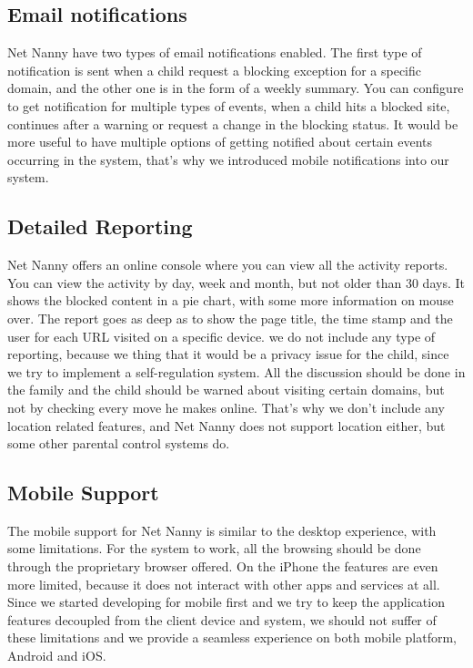 \subsection{Email notifications}

Net Nanny have two types of email notifications enabled. The first type of notification is sent when a child request a blocking exception for a specific domain, and the other one is in the form of a weekly summary. You can configure to get notification for multiple types of events, when a child hits a blocked site, continues after a warning or request a change in the blocking status. It would be more useful to have multiple options of getting notified about certain events occurring in the system, that's why we introduced mobile notifications into our system.

\subsection{Detailed Reporting}

Net Nanny offers an online console where you can view all the activity reports. You can view the activity by day, week and month, but not older than 30 days. It shows the blocked content in a pie chart, with some more information on mouse over. The report goes as deep as to show the page title, the time stamp and the user for each URL visited on a specific device. we do not include any type of reporting, because we thing that it would be a privacy issue for the child, since we try to implement a self-regulation system. All the discussion should be done in the family and the child should be warned about visiting certain domains, but not by checking every move he makes online. That's why we don't include any location related features, and Net Nanny does not support location either, but some other parental control systems do.

\subsection{Mobile Support}

The mobile support for Net Nanny is similar to the desktop experience, with some limitations. For the system to work, all the browsing should be done through the proprietary browser offered. On the iPhone the features are even more limited, because it does not interact with other apps and services at all. Since we started developing for mobile first and we try to keep the application features decoupled from the client device and system, we should not suffer of these limitations and we provide a seamless experience on both mobile platform, Android and iOS. \parencite{netNannyPCMag}

